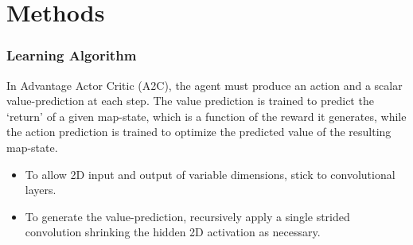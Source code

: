 \documentclass[xcolor=dvipsnames]{beamer}
\begin{document}
\section{Methods}
\begin{frame}
    \frametitle{Learning Algorithm}
	In Advantage Actor Critic (A2C), the agent must produce an action and a scalar value-prediction at each step. The value prediction is trained to predict the `return' of a given map-state, which is a function of the reward it generates, while the action prediction is trained to optimize the predicted value of the resulting map-state.
	\begin{itemize}
		\item To allow 2D input and output of variable dimensions, stick to convolutional layers.
		\item To generate the value-prediction, recursively apply a single strided convolution shrinking the hidden 2D activation as necessary.
\end{itemize}
\end{frame}
\end{document}
